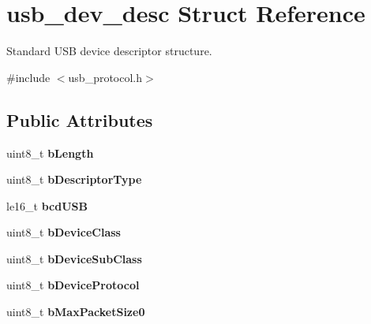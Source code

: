 \hypertarget{structusb__dev__desc}{}\section{usb\+\_\+dev\+\_\+desc Struct Reference}
\label{structusb__dev__desc}


Standard U\+SB device descriptor structure.  




{\ttfamily \#include $<$usb\+\_\+protocol.\+h$>$}

\subsection*{Public Attributes}
\begin{DoxyCompactItemize}
\item 
\mbox{\label{structusb__dev__desc_a749f4b4da5052b73cf24b37ec4733f9c}} 
uint8\+\_\+t {\bfseries b\+Length}
\item 
\mbox{\label{structusb__dev__desc_a98dcd392321a18c79808ee7d5e9705a3}} 
uint8\+\_\+t {\bfseries b\+Descriptor\+Type}
\item 
\mbox{\label{structusb__dev__desc_ac48fb2b77cd2d9cacbf6b73e08de02bc}} 
le16\+\_\+t {\bfseries bcd\+U\+SB}
\item 
\mbox{\label{structusb__dev__desc_a368fc9747b64fdee41d2be88f9454fef}} 
uint8\+\_\+t {\bfseries b\+Device\+Class}
\item 
\mbox{\label{structusb__dev__desc_a24d2db5c91f5c46f05ce4afff069ed99}} 
uint8\+\_\+t {\bfseries b\+Device\+Sub\+Class}
\item 
\mbox{\label{structusb__dev__desc_ac8b14b8cb36ac67e1ec53d3d00e41fce}} 
uint8\+\_\+t {\bfseries b\+Device\+Protocol}
\item 
\mbox{\label{structusb__dev__desc_a74b86cf23907d626d4f521b5e00d6f94}} 
uint8\+\_\+t {\bfseries b\+Max\+Packet\+Size0}
\item 
\mbox{\label{structusb__dev__desc_a9a1cb8f3778a9c5a58d1713e1ca49ba9}} 

\end{DoxyCompactItemize}
